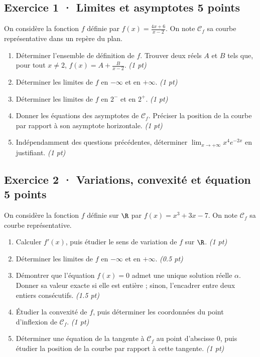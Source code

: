 \subsection*{Exercice 1 · Limites et asymptotes \hfill 5 points}On considère la fonction $f$ définie par $f(x)=\frac{4x+6}{x-2}$. On note $\mathcal C_f$ sa courbe représentative dans un repère du plan.

\begin{enumerate}

\item Déterminer l'ensemble de définition de $f$. Trouver deux réels $A$ et $B$ tels que, pour tout $x\ne2$, $f(x)=A+\frac B{x-2}$. \hfill\textit{(1 pt)}

\item Déterminer les limites de $f$ en $-\infty$ et en $+\infty$. \hfill\textit{(1 pt)}

\item Déterminer les limites de $f$ en $2^-$ et en $2^+$. \hfill\textit{(1 pt)}

\item Donner les équations des asymptotes de $\mathcal C_f$. Préciser la position de la courbe par rapport à son asymptote horizontale. \hfill\textit{(1 pt)}

\item Indépendamment des questions précédentes, déterminer $\displaystyle\lim_{x\to+\infty}x^{4}e^{-2x}$ en justifiant. \hfill\textit{(1 pt)}

\end{enumerate}

\subsection*{Exercice 2 · Variations, convexité et équation \hfill 5 points}On considère la fonction $f$ définie sur $\R$ par $f(x)=x^3+3x-7$. On note $\mathcal C_f$ sa courbe représentative.

\begin{enumerate}

\item Calculer $f' (x)$, puis étudier le sens de variation de $f$ sur $\R$. \hfill\textit{(1 pt)}

\item Déterminer les limites de $f$ en $-\infty$ et en $+\infty$. \hfill\textit{(\num{0,5} pt)}

\item Démontrer que l'équation $f(x)=0$ admet une unique solution réelle $\alpha$. Donner sa valeur exacte si elle est entière ; sinon, l'encadrer entre deux entiers consécutifs. \hfill\textit{(\num{1,5} pt)}

\item Étudier la convexité de $f$, puis déterminer les coordonnées du point d'inflexion de $\mathcal C_f$. \hfill\textit{(1 pt)}

\item Déterminer une équation de la tangente à $\mathcal C_f$ au point d'abscisse $0$, puis étudier la position de la courbe par rapport à cette tangente. \hfill\textit{(1 pt)}

\end{enumerate}

